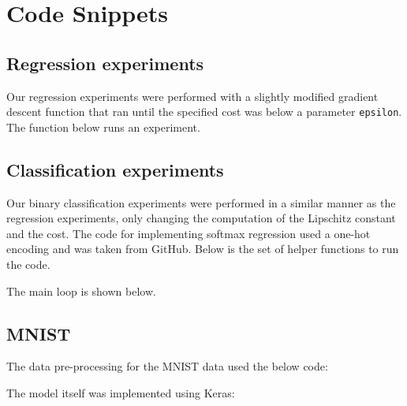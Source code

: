 \documentclass[sigconf,authordraft]{acmart}
\begin{document}
\section{Code Snippets}
\subsection{Regression experiments}
Our regression experiments were performed with a slightly modified gradient descent function that ran until the specified cost was below a parameter \texttt{epsilon}. The function below runs an experiment.


\subsection{Classification experiments}
Our binary classification experiments were performed in a similar manner as the regression experiments, only changing the computation of the Lipschitz constant and the cost. The code for implementing softmax regression used a one-hot encoding and was taken from GitHub\cite{softmax}. Below is the set of helper functions to run the code.

The main loop is shown below.


\subsection{MNIST}
The data pre-processing for the MNIST data used the below code:

The model itself was implemented using Keras:

\end{document}
